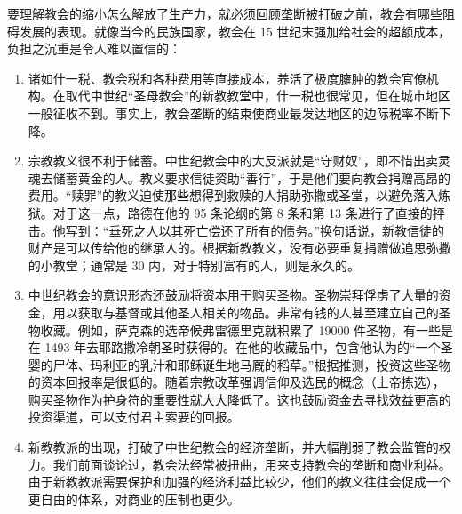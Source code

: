 要理解教会的缩小怎么解放了生产力，就必须回顾垄断被打破之前，教会有哪些阻碍发展的表现。就像当今的民族国家，教会在 15 世纪末强加给社会的超额成本，负担之沉重是令人难以置信的：

\begin{enumerate}
    \item 诸如什一税、教会税和各种费用等直接成本，养活了极度臃肿的教会官僚机构。在取代中世纪“圣母教会”的新教教堂中，什一税也很常见，但在城市地区一般征收不到。事实上，教会垄断的结束使商业最发达地区的边际税率不断下降。
    \item 宗教教义很不利于储蓄。中世纪教会中的大反派就是“守财奴”，即不惜出卖灵魂去储蓄黄金的人。教义要求信徒资助“善行”，于是他们要向教会捐赠高昂的费用。“赎罪”的教义迫使那些想得到救赎的人捐助弥撒或圣堂，以避免落入炼狱。对于这一点，路德在他的 95 条论纲的第 8 条和第 13 条进行了直接的抨击。他写到：“垂死之人以其死亡偿还了所有的债务。”换句话说，新教信徒的财产是可以传给他的继承人的。根据新教教义，没有必要重复捐赠做追思弥撒的小教堂；通常是 30 内，对于特别富有的人，则是永久的。
    \item 中世纪教会的意识形态还鼓励将资本用于购买圣物。圣物崇拜俘虏了大量的资金，用以获取与基督或其他圣人相关的物品。非常有钱的人甚至建立自己的圣物收藏。例如，萨克森的选帝候弗雷德里克就积累了 19000 件圣物，有一些是在 1493 年去耶路撒冷朝圣时获得的。在他的收藏品中，包含他认为的“一个圣婴的尸体、玛利亚的乳汁和耶稣诞生地马厩的稻草。”根据推测，投资这些圣物的资本回报率是很低的。随着宗教改革强调信仰及选民的概念（上帝拣选），购买圣物作为护身符的重要性就大大降低了。这也鼓励资金去寻找效益更高的投资渠道，可以支付君主索要的回报。
    \item 新教教派的出现，打破了中世纪教会的经济垄断，并大幅削弱了教会监管的权力。我们前面谈论过，教会法经常被扭曲，用来支持教会的垄断和商业利益。由于新教教派需要保护和加强的经济利益比较少，他们的教义往往会促成一个更自由的体系，对商业的压制也更少。

\end{enumerate}
